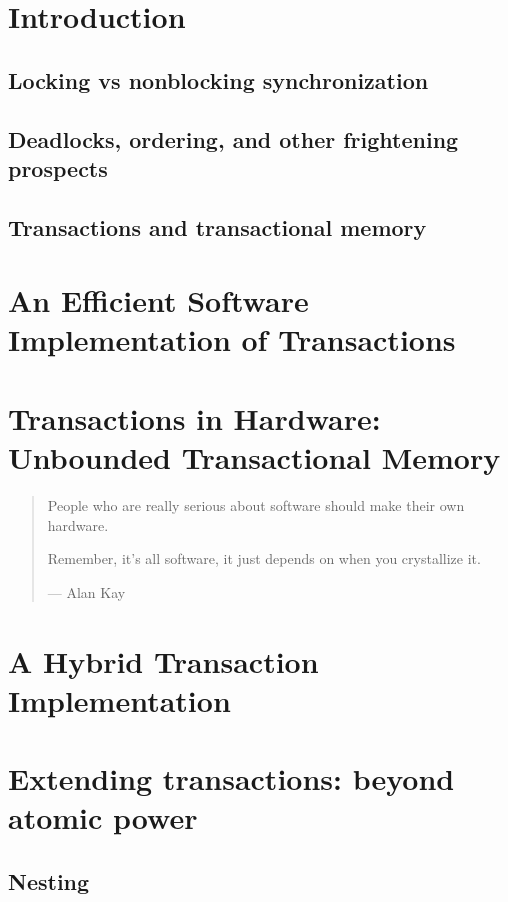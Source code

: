 \documentclass[12pt,titlepage,twoside]{article}
\author{C. Scott Ananian}
\title{\subtitle}
\date{\subdate \\ $ $Revision: 1.1 $ $}
\begin{document}



\cleardoublepage
\section{Introduction}
\subsection{Locking vs nonblocking synchronization}
\subsection{Deadlocks, ordering, and other frightening prospects}
\subsection{Transactions and transactional memory}

\section{An Efficient Software Implementation of Transactions}

\section{Transactions in Hardware: Unbounded Transactional Memory}
\begin{quote}
People who are really serious about software should make their own hardware.

Remember, it's all software, it just depends on when you crystallize
it. 

 --- Alan Kay

\end{quote}


\section{A Hybrid Transaction Implementation}

\section{Extending transactions: beyond atomic power}

\subsection{Nesting}
\end{document}

